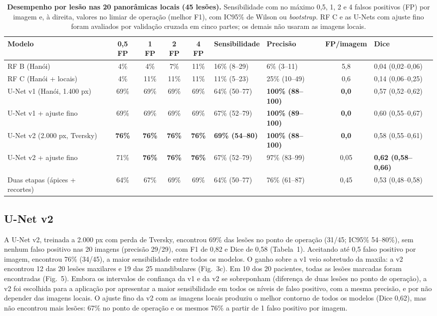 \documentclass[twocolumn]{article}
\begin{document}
\begin{table}[!t]
\caption{\textbf{Desempenho por lesão nas 20 panorâmicas locais (45 lesões).} Sensibilidade com no máximo 0,5, 1, 2 e 4 falsos positivos (FP) por imagem e, à direita, valores no limiar de operação (melhor F1), com IC95\% de Wilson ou \textit{bootstrap}. RF C e as U-Nets com ajuste fino foram avaliados por validação cruzada em cinco partes; os demais não usaram as imagens locais.}
\centering\tablefont
\begin{tabularx}{\textwidth}{L *{4}{c} Y Y c Y}
\toprule
Modelo & 0,5 FP & 1 FP & 2 FP & 4 FP & Sensibilidade & Precisão & FP/imagem & Dice \\
\midrule
RF B (Hanói) & 4\% & 4\% & 7\% & 11\% & 16\% (8--29) & 6\% (3--11) & 5,8 & 0,04 (0,02--0,06) \\
RF C (Hanói + locais) & 4\% & 11\% & 11\% & 11\% & 11\% (5--23) & 25\% (10--49) & 0,6 & 0,14 (0,06--0,25) \\
U-Net v1 (Hanói, 1.400 px) & 69\% & 69\% & 69\% & 69\% & 64\% (50--77) & \textbf{100\% (88--100)} & \textbf{0,0} & 0,57 (0,52--0,62) \\
U-Net v1 + ajuste fino & 69\% & 69\% & 69\% & 69\% & 67\% (52--79) & \textbf{100\% (89--100)} & \textbf{0,0} & 0,60 (0,55--0,67) \\
U-Net v2 (2.000 px, Tversky) & \textbf{76\%} & \textbf{76\%} & \textbf{76\%} & \textbf{76\%} & \textbf{69\% (54--80)} & \textbf{100\% (88--100)} & \textbf{0,0} & 0,58 (0,55--0,61) \\
U-Net v2 + ajuste fino & 71\% & \textbf{76\%} & \textbf{76\%} & \textbf{76\%} & 67\% (52--79) & 97\% (83--99) & 0,05 & \textbf{0,62 (0,58--0,66)} \\
Duas etapas (ápices + recortes) & 64\% & 67\% & 69\% & 69\% & 64\% (50--77) & 76\% (61--87) & 0,45 & 0,53 (0,48--0,58) \\
\bottomrule
\end{tabularx}
\end{table}

\subsection{U-Net v2}

A U-Net v2, treinada a 2.000 px com perda de Tversky, encontrou 69\% das lesões no ponto de operação (31/45; IC95\% 54--80\%), sem nenhum falso positivo nas 20 imagens (precisão 29/29), com F1 de 0,82 e Dice de 0,58 (Tabela~1). Aceitando até 0,5 falso positivo por imagem, encontrou 76\% (34/45), a maior sensibilidade entre todos os modelos. O ganho sobre a v1 veio sobretudo da maxila: a v2 encontrou 12 das 20 lesões maxilares e 19 das 25 mandibulares (Fig.~3c). Em 10 dos 20 pacientes, todas as lesões marcadas foram encontradas (Fig.~5). Embora os intervalos de confiança da v1 e da v2 se sobreponham (diferença de duas lesões no ponto de operação), a v2 foi escolhida para a aplicação por apresentar a maior sensibilidade em todos os níveis de falso positivo, com a mesma precisão, e por não depender das imagens locais. O ajuste fino da v2 com as imagens locais produziu o melhor contorno de todos os modelos (Dice 0,62), mas não encontrou mais lesões: 67\% no ponto de operação e os mesmos 76\% a partir de 1 falso positivo por imagem.
\end{document}

